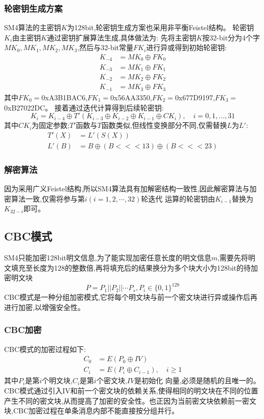 \subsubsection{轮密钥生成方案}
SM4算法的主密钥$K$为128bit,轮密钥生成方案也采用非平衡Feistel结构。
轮密钥\(K_i\)由主密钥\(K\)通过密钥扩展算法生成,具体做法为:
先将主密钥\(K\)按32-bit分为4个字\(MK_0,MK_1,MK_2,MK_3\),然后与32-bit常量\(FK_i\)进行异或得到初始轮密钥:
\[
\begin{aligned}
    K_{-4} &= MK_0 \oplus FK_0 \\
    K_{-3} &= MK_1 \oplus FK_1 \\
    K_{-2} &= MK_2 \oplus FK_2 \\
    K_{-1} &= MK_3 \oplus FK_3
\end{aligned}
\]
其中$FK_0 = $0xA3B1BAC6,$FK_1 = $0x56AA3350,$FK_2 = $0x677D9197,$FK_3 = $0xB27022DC。
接着通过迭代计算得到后续轮密钥:
\[
K_i = K_{i-4} \oplus T'(K_{i-3} \oplus K_{i-2} \oplus K_{i-1} \oplus CK_i), \quad i=0,1,...,31
\]
其中$CK_i$为固定参数;\(T'\)函数与\(T\)函数类似,但线性变换部分不同,仅需替换$L$为$L'$:
\[
\begin{aligned}
    T'(X) &= L'(S(X)) \\
    L'(B) &= B \oplus (B <<< 13) \oplus (B <<< 23)
\end{aligned}  
\]

\subsubsection{解密算法}
因为采用广义Feistel结构,所以SM4算法具有加解密结构一致性,因此解密算法与加密算法一致,仅需将参与第$i(i = 1,2,\cdots,32)$轮迭代
运算的轮密钥由$K_{i-1}$替换为$K_{32-i}$即可。




\subsection{CBC模式}
SM4只能加密128bit明文信息,为了能实现加密任意长度的明文信息$m$,需要先将明文填充至长度为128的整数倍,再将填充后的结果换分为多个块大小为128bit的待加密明文块
    \[ P = P_1 || P_2 || \cdots P_s,P_i \in\{0,1\}^{128} \]
CBC模式是一种分组加密模式,它将每个明文块与前一个密文块进行异或操作后再进行加密,以增强安全性。
\subsubsection{CBC加密}
CBC模式的加密过程如下:
\[
\begin{aligned}
    C_0 &= E(P_0 \oplus IV) \\
    C_i &= E(P_i \oplus C_{i-1}), \quad i \geq 1
\end{aligned}
\]
其中\(P_i\)是第\(i\)个明文块,\(C_i\)是第\(i\)个密文块,\(IV\)是初始化
向量,必须是随机的且唯一的。CBC模式通过引入IV和前一个密文块的依赖关系,使得相同的明文块在不同的位置产生不同的密文块,从而提高了加密的安全性。也正因为当前密文块依赖前一密文块,CBC加密过程在单条消息内部不能直接按分组并行。
